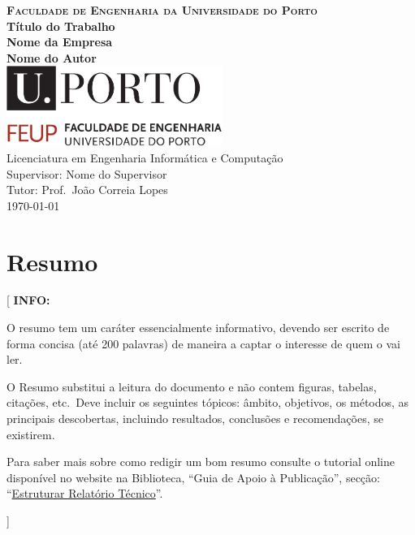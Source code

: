 \documentclass[11pt,a4paper]{report}
\newcommand{\school}{Faculdade de Engenharia da Universidade do Porto}
\newcommand{\degree}{Licenciatura em Engenharia Informática e Computação}
\newcommand{\projtitle}{Título do Trabalho}
\newcommand{\company}{Nome da Empresa}
\newcommand{\projauthor}{Nome do Autor}
\newcommand{\supervisor}{Nome do Supervisor}
\newcommand{\tutor}{Prof.\ João Correia Lopes}
\newenvironment{info}[1]{\vspace*{6mm}\color{blue}
                            [ \textbf{INFO:} \begin{em} #1}
                        {\vspace*{3mm}\end{em} ]}
\begin{document}
\setcounter{page}{1}


\begin{titlepage}
\center

\vspace{-15mm}
{\Large \textbf{\textsc{\school}}}\\[28mm]

{\huge \textbf{\projtitle}}\\[8mm]
{\huge \textbf{\company}}\\[30mm]

{\Large \textbf{\projauthor}}\\[56mm]

\includegraphics[width=70mm]{uporto-feup.pdf}\\[30mm]

{\large \degree}\\[12mm]
{\large Supervisor: \supervisor}\\[4mm]
{\large Tutor: \tutor}\\[12mm]

\today

\end{titlepage}


\chapter*{Resumo}

\begin{info}
O resumo tem um caráter essencialmente informativo, devendo ser
escrito de forma concisa (até 200 palavras) de maneira a captar o
interesse de quem o vai ler.

O Resumo substitui a leitura do documento e não contem figuras,
tabelas, citações, etc.\ 
Deve incluir os seguintes tópicos: âmbito, objetivos, os métodos, as
principais descobertas, incluindo resultados, conclusões e
recomendações, se existirem.

Para saber mais sobre como redigir um bom resumo consulte o tutorial
online disponível no website na Biblioteca, ``Guia de Apoio à
Publicação'', secção: 
``\href{https://docs.google.com/document/d/1TDC1behVq8x7fQL4CcPEEh_np5GXviJevQxnQ9gbiJs/edit\#heading=h.s4z9k57ywd9w}
{Estruturar Relatório Técnico}''.
\end{info}
\end{document}
